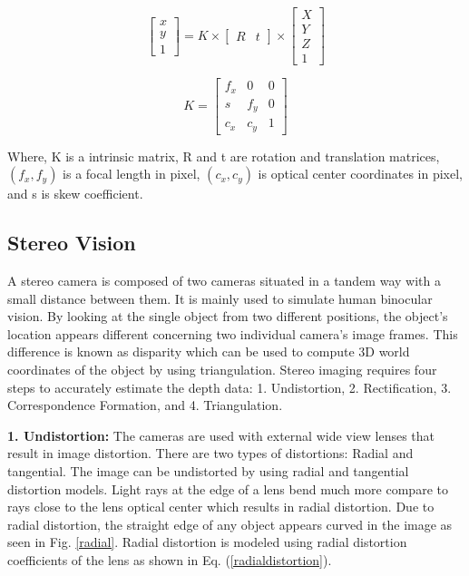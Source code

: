 \begin{equation}
\left[\begin{array}{ccc}
x \\
y \\
1
\end{array}\right] 
 = K \times 
\left[\begin{array}{ccc}
R & t
\end{array}\right] 
 \times
\left[\begin{array}{ccc}
X \\
Y \\
Z \\
1
\end{array}\right]  
\end{equation}

\begin{equation}
K = \left[\begin{array}{ccc}f_{x} & 0 & 0 \\ s & f_{y} & 0 \\ c_{x} & c_{y} & 1\end{array}\right] 
\end{equation}

Where, K is a intrinsic matrix, R and t are rotation and translation matrices, $(f_{x},f_{y})$ is a focal length in pixel, $(c_{x},c_{y})$ is optical center coordinates in pixel, and s is skew coefficient. 

\subsection{Stereo Vision}
A stereo camera is composed of two cameras situated in a tandem way with a small distance between them. It is mainly used to simulate human binocular vision. By looking at the single object from two different positions, the object's location appears different concerning two individual camera's image frames. This difference is known as disparity which can be used to compute 3D world coordinates of the object by using triangulation. Stereo imaging requires four steps to accurately estimate the depth data: 1. Undistortion, 2. Rectification, 3. Correspondence Formation, and 4. Triangulation.

\textbf{1. Undistortion:}
The cameras are used with external wide view lenses that result in image distortion. There are two types of distortions: Radial and tangential. The image can be undistorted by using radial and tangential distortion models. Light rays at the edge of a lens bend much more compare to rays close to the lens optical center which results in radial distortion. Due to radial distortion, the straight edge of any object appears curved in the image as seen in Fig. \ref{radial}. Radial distortion is modeled using radial distortion coefficients of the lens as shown in Eq. (\ref{radialdistortion}).

